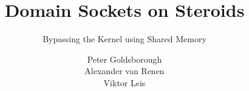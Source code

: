 





\begin{frame}[plain]
  \vspace{1.7cm}
    \title{Domain Sockets on Steroids}
    \subtitle{Bypassing the Kernel using Shared Memory}
    \author{
      \small
      Peter Goldsborough \\
      Alexander van Renen \\
      Viktor Leis
    }
    \titlepage
\end{frame}












